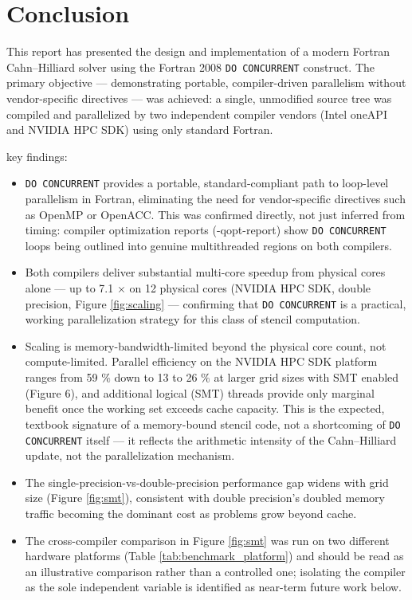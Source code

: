 \documentclass[11pt,a4paper]{article}
\begin{document}
	\section{Conclusion}
	\label{sec:conclusion}
	
	This report has presented the design and implementation of a modern Fortran Cahn–Hilliard solver using the Fortran 2008 \texttt{DO CONCURRENT} construct. The primary objective — demonstrating portable, compiler-driven parallelism without vendor-specific directives — was achieved: a single, unmodified source tree was compiled and parallelized by two independent compiler vendors (Intel oneAPI and NVIDIA HPC SDK) using only standard Fortran.
	
	key findings:
	
	\begin{itemize}
	\item \texttt{DO CONCURRENT} provides a portable, standard-compliant path to loop-level parallelism in Fortran, eliminating the need for vendor-specific directives such as OpenMP or OpenACC. This was confirmed directly, not just inferred from timing: compiler optimization reports (-qopt-report) show \texttt{DO CONCURRENT} loops being outlined into genuine multithreaded regions on both compilers.
	
	

	\item Both compilers deliver substantial multi-core speedup from physical cores alone — up to 7.1 $\times$ on 12 physical cores (NVIDIA HPC SDK, double precision, Figure {\ref{fig:scaling}} — confirming that \texttt{DO CONCURRENT} is a practical, working parallelization strategy for this class of stencil computation.
	

	\item Scaling is memory-bandwidth-limited beyond the physical core count, not compute-limited. Parallel efficiency on the NVIDIA HPC SDK platform ranges from 59 $\%$ down to 13 to 26 $\%$ at larger grid sizes with SMT enabled (Figure 6), and additional logical (SMT) threads provide only marginal benefit once the working set exceeds cache capacity. This is the expected, textbook signature of a memory-bound stencil code, not a shortcoming of  \texttt{DO CONCURRENT} itself — it reflects the arithmetic intensity of the Cahn–Hilliard update, not the parallelization mechanism.
	
	\item The single-precision-vs-double-precision performance gap widens with grid size (Figure \ref{fig:smt}), consistent with double precision's doubled memory traffic becoming the dominant cost as problems grow beyond cache.
	
	\item The cross-compiler comparison in Figure \ref{fig:smt} was run on two different hardware platforms (Table \ref*{tab:benchmark_platform}) and should be read as an illustrative comparison rather than a controlled one; isolating the compiler as the sole independent variable is identified as near-term future work below.
	
	\end{itemize}
	
\end{document}

